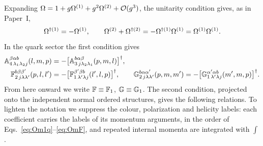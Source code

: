 Expanding $\Omega=1+g\Omega^{(1)}+g^{2}\Omega^{(2)}+\mathcal{O}(g^{3})$, the unitarity condition gives, as in
Paper~I,
\begin{equation}
\Omega^{\dagger(1)}=-\Omega^{(1)},\qquad
\Omega^{(2)}+\Omega^{\dagger(2)}=-\Omega^{\dagger(1)}\Omega^{(1)}=\Omega^{(1)}\Omega^{(1)} .
\label{eq:U12}
\end{equation}
In the quark sector the first condition gives
\begin{align}
\mathbb{A}^{\beta\alpha b}_{4\,\lambda_{1}\lambda_{2}j}(l,m,p)&=-\big[\mathbb{A}^{b\alpha\beta}_{3\,j\lambda_{2}\lambda_{1}}(p,m,l)\big]^{\dagger},
\nonumber\\
\mathbb{F}^{b\beta\beta'}_{2\,j\lambda\lambda'}(p,l,l')&=-\big[\mathbb{F}^{\beta'\beta b}_{1\,\lambda'\lambda j}(l',l,p)\big]^{\dagger},
\qquad
\mathbb{G}^{b\alpha\alpha'}_{2\,j\lambda\lambda'}(p,m,m')=-\big[\mathbb{G}^{\alpha'\alpha b}_{1\,\lambda'\lambda j}(m',m,p)\big]^{\dagger}.
\label{eq:U1}
\end{align}
From here onward we write $\mathbb{F}\equiv\mathbb{F}_{1}$, $\mathbb{G}\equiv\mathbb{G}_{1}$. The second condition,
projected onto the independent normal ordered structures, gives the following relations. To
lighten the notation we suppress the colour, polarization and helicity labels: each coefficient
carries the labels of its momentum arguments, in the order of Eqs.~\eqref{eq:Om1q}--\eqref{eq:OmF},
and repeated internal momenta are integrated with $\int$.
